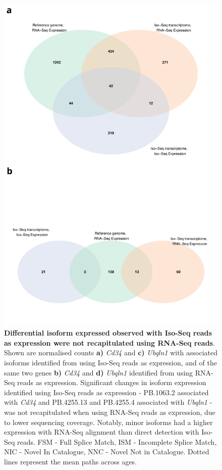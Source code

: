 \begin{figure}[!htp]
	\centering
	\includegraphics[page=15,scale = 0.55]{Figures/WholeDifferentialAnalysis.pdf}
	\captionsetup{width=0.95\textwidth}
	\caption[Differential isoform expressed observed with Iso-Seq reads as expression were not recapitulated using RNA-Seq reads]%
	{\textbf{Differential isoform expressed observed with Iso-Seq reads as expression were not recapitulated using RNA-Seq reads}. Shown are normalised counts \textbf{a)} \textit{Cd34} and \textbf{c)} \textit{Ubqln1} with associated isoforms identified from using Iso-Seq reads as expression, and of the same two genes \textbf{b)} \textit{Cd34} and \textbf{d)} \textit{Ubqln1} identified from using RNA-Seq reads as expression. Significant changes in isoform expression identified using Iso-Seq reads as expression - PB.1063.2 associated with \textit{Cd34} and PB.4255.13 and PB.4255.4 associated with \textit{Ubqln1} - was not recapitulated when using RNA-Seq reads as expression, due to lower sequencing coverage. Notably, minor isoforms had a higher expression with RNA-Seq alignment than direct detection with Iso-Seq reads.
	FSM - Full Splice Match, ISM - Incomplete Splice Match, NIC - Novel In Catalogue, NNC - Novel Not in Catalogue. Dotted lines represent the mean paths across ages.
	}   
	\label{fig:dei_lowisoexp}
\end{figure}

